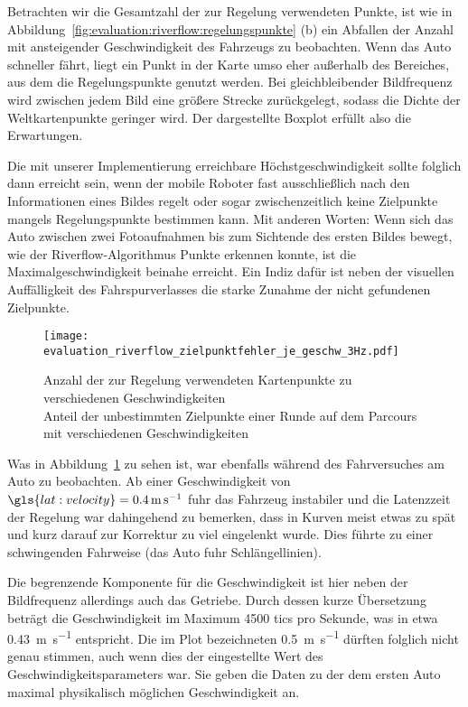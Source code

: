 Betrachten wir die Gesamtzahl der zur Regelung verwendeten Punkte, ist wie in Abbildung~\ref{fig:evaluation:riverflow:regelungspunkte} (b) ein Abfallen der Anzahl mit ansteigender Geschwindigkeit des Fahrzeugs zu beobachten. Wenn das Auto schneller fährt, liegt ein Punkt in der Karte umso eher außerhalb des Bereiches, aus dem die Regelungspunkte genutzt werden. Bei gleichbleibender Bildfrequenz wird zwischen jedem Bild eine größere Strecke zurückgelegt, sodass die Dichte der Weltkartenpunkte geringer wird. Der dargestellte Boxplot erfüllt also die Erwartungen.

Die mit unserer Implementierung erreichbare Höchstgeschwindigkeit sollte folglich dann erreicht sein, wenn der mobile Roboter fast ausschließlich nach den Informationen eines Bildes regelt oder sogar zwischenzeitlich keine Zielpunkte mangels Regelungspunkte bestimmen kann. Mit anderen Worten: Wenn sich das Auto zwischen zwei Fotoaufnahmen bis zum Sichtende des ersten Bildes bewegt, wie der Riverflow-Algorithmus Punkte erkennen konnte, ist die Maximalgeschwindigkeit beinahe erreicht. Ein Indiz dafür ist neben der visuellen Auffälligkeit des Fahrspurverlasses die starke Zunahme der nicht gefundenen Zielpunkte. 

\begin{figure}[htbp] %
	\centering
	\texttt{[image: evaluation\_riverflow\_zielpunktfehler\_je\_geschw\_3Hz.pdf]}
	\caption{Anzahl der zur Regelung verwendeten Kartenpunkte zu verschiedenen Geschwindigkeiten \\
	Anteil der unbestimmten Zielpunkte einer Runde auf dem Parcours mit verschiedenen Geschwindigkeiten}
	\label{fig:evaluation:riverflow:zielpunktfehler_je_geschw}
\end{figure}

Was in Abbildung~\ref{fig:evaluation:riverflow:zielpunktfehler_je_geschw} zu sehen ist, war ebenfalls während des Fahrversuches am Auto zu beobachten. Ab einer Geschwindigkeit von \( \gls{lat:velocity} = \SI{0,4}{\metre\per\second} \) fuhr das Fahrzeug instabiler und die Latenzzeit der Regelung war dahingehend zu bemerken, dass in Kurven meist etwas zu spät und kurz darauf zur Korrektur zu viel eingelenkt wurde. Dies führte zu einer schwingenden Fahrweise (das Auto fuhr \glqq Schlängellinien\grqq). 

Die begrenzende Komponente für die Geschwindigkeit ist hier neben der Bildfrequenz allerdings auch das Getriebe. Durch dessen kurze Übersetzung beträgt die Geschwindigkeit im Maximum 4500 tics pro Sekunde, was in etwa \SI{0,43}{\metre\per\second} entspricht. Die im Plot bezeichneten \SI{0,5}{\metre\per\second} dürften folglich nicht genau stimmen, auch wenn dies der eingestellte Wert des Geschwindigkeitsparameters war. Sie geben die Daten zu der dem ersten Auto maximal physikalisch möglichen Geschwindigkeit an. 

